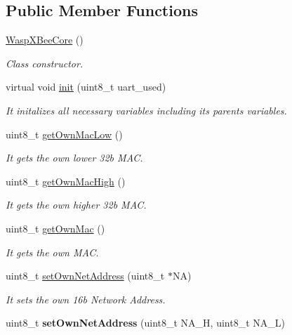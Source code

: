 \subsection*{Public Member Functions}
\begin{DoxyCompactItemize}
\item 
\hyperlink{class_wasp_x_bee_core_a7a47046f3552cc18bb6331a5971394a3}{Wasp\+X\+Bee\+Core} ()
\begin{DoxyCompactList}\small\item\em Class constructor. \end{DoxyCompactList}\item 
virtual void \hyperlink{class_wasp_x_bee_core_a38936686684436eb38429103b70874f1}{init} (uint8\+\_\+t uart\+\_\+used)\hypertarget{class_wasp_x_bee_core_a38936686684436eb38429103b70874f1}{}\label{class_wasp_x_bee_core_a38936686684436eb38429103b70874f1}

\begin{DoxyCompactList}\small\item\em It initalizes all necessary variables including its parent\textquotesingle{}s variables. \end{DoxyCompactList}\item 
uint8\+\_\+t \hyperlink{class_wasp_x_bee_core_a3469d1adb7e54fd06a6a6b7577b3b6b5}{get\+Own\+Mac\+Low} ()
\begin{DoxyCompactList}\small\item\em It gets the own lower 32b M\+AC. \end{DoxyCompactList}\item 
uint8\+\_\+t \hyperlink{class_wasp_x_bee_core_a54bcdf819b4987da3e8ca9efc2bd373a}{get\+Own\+Mac\+High} ()
\begin{DoxyCompactList}\small\item\em It gets the own higher 32b M\+AC. \end{DoxyCompactList}\item 
uint8\+\_\+t \hyperlink{class_wasp_x_bee_core_a997beedd8316cfc825d954ee4cacf21a}{get\+Own\+Mac} ()
\begin{DoxyCompactList}\small\item\em It gets the own M\+AC. \end{DoxyCompactList}\item 
uint8\+\_\+t \hyperlink{class_wasp_x_bee_core_aff2a2dad4ae20b1e143f1d7188e0d019}{set\+Own\+Net\+Address} (uint8\+\_\+t $\ast$NA)
\begin{DoxyCompactList}\small\item\em It sets the own 16b Network Address. \end{DoxyCompactList}\item 
uint8\+\_\+t {\bfseries set\+Own\+Net\+Address} (uint8\+\_\+t N\+A\+\_\+H, uint8\+\_\+t N\+A\+\_\+L)\hypertarget{class_wasp_x_bee_core_ae328126c983bf9849cabc2dc787601c2}{}\label{class_wasp_x_bee_core_ae328126c983bf9849cabc2dc787601c2}


\end{DoxyCompactItemize}
